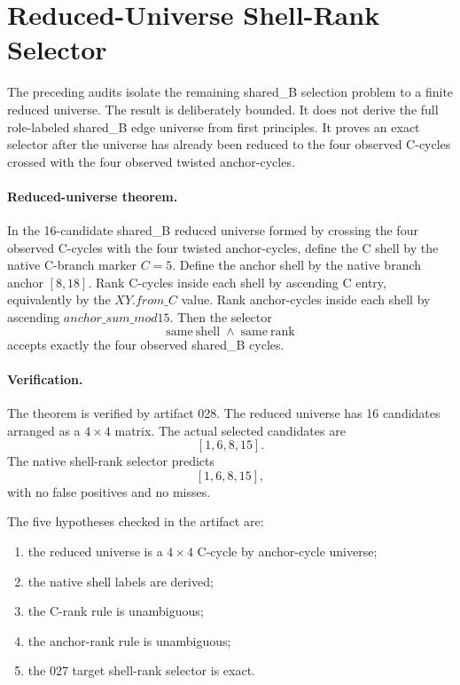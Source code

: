 \section{Reduced-Universe Shell-Rank Selector}
\label{sec:reduced-universe-shell-rank-selector}

The preceding audits isolate the remaining shared\_B selection problem to a finite reduced universe.  The result is deliberately bounded.  It does not derive the full role-labeled shared\_B edge universe from first principles.  It proves an exact selector after the universe has already been reduced to the four observed C-cycles crossed with the four observed twisted anchor-cycles.

\paragraph{Reduced-universe theorem.}
In the 16-candidate shared\_B reduced universe formed by crossing the four observed C-cycles with the four twisted anchor-cycles, define the C shell by the native C-branch marker \(C=5\).  Define the anchor shell by the native branch anchor \([8,18]\).  Rank C-cycles inside each shell by ascending C entry, equivalently by the \(XY.from\_C\) value.  Rank anchor-cycles inside each shell by ascending \(anchor\_sum\_mod15\).  Then the selector
\[
    \mathrm{same\ shell} \;\wedge\; \mathrm{same\ rank}
\]
accepts exactly the four observed shared\_B cycles.

\paragraph{Verification.}
The theorem is verified by artifact 028.  The reduced universe has 16 candidates arranged as a \(4 \times 4\) matrix.  The actual selected candidates are
\[
    [1,6,8,15].
\]
The native shell-rank selector predicts
\[
    [1,6,8,15],
\]
with no false positives and no misses.

The five hypotheses checked in the artifact are:

\begin{enumerate}
\item the reduced universe is a \(4 \times 4\) C-cycle by anchor-cycle universe;
\item the native shell labels are derived;
\item the C-rank rule is unambiguous;
\item the anchor-rank rule is unambiguous;
\item the 027 target shell-rank selector is exact.
\end{enumerate}

